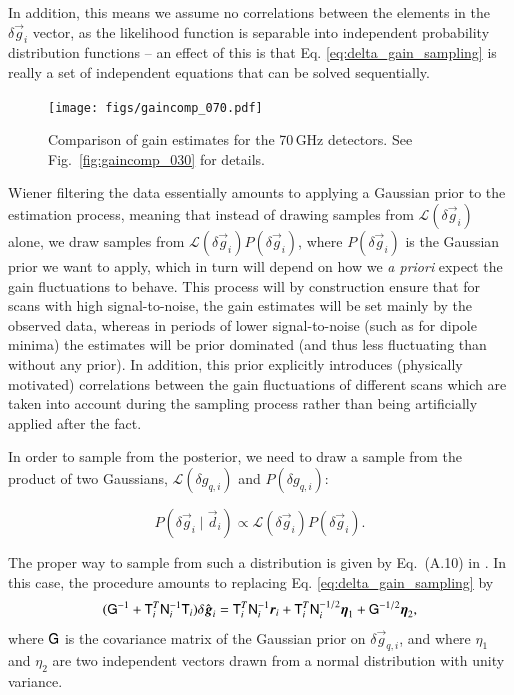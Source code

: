 \documentclass[twocolumn]{aa}
\renewcommand{\d}[0]{\vec{d}}
\newcommand{\T}[0]{\tens{T}}
\newcommand{\tG}[0]{\tens{G}}
\newcommand{\g}[0]{\vec{g}}
\newcommand{\N}[0]{\tens{N}}
\renewcommand{\r}[0]{\vec{r}}
\newcommand{\qi}[0]{_{q, i}}
\begin{document}
In addition, this means we assume no correlations between the elements in the $\delta \g_i$ vector, as the likelihood function is separable into independent probability distribution functions -- an effect of this is that Eq. \eqref{eq:delta_gain_sampling} is really a set of independent equations that can be solved sequentially. 
\begin{figure}[t]
  \center
  \texttt{[image: figs/gaincomp\_070.pdf]}
    \caption{Comparison of gain estimates for the 70\,GHz detectors. See Fig.~\ref{fig:gaincomp_030} for details.}
  \label{fig:gaincomp_070}
\end{figure}




Wiener filtering the data essentially amounts to applying a Gaussian prior to the estimation process, meaning that instead of drawing samples from $\mathcal{L}(\delta \g_i)$ alone, we draw samples from $\mathcal{L}(\delta \g_i) P(\delta \g_i)$, where $P(\delta \g_i)$ is the Gaussian prior we want to apply, which in turn will depend on how we \emph{a priori} expect the gain fluctuations to behave. This process will by construction ensure that for scans with high signal-to-noise, the gain estimates will be set mainly by the observed data, whereas in periods of lower signal-to-noise (such as for dipole minima) the estimates will be prior dominated (and thus less fluctuating than without any prior). In addition, this prior explicitly introduces (physically motivated) correlations between the gain fluctuations of different scans which are taken into account during the sampling process rather than being artificially applied after the fact.

In order to sample from the posterior, we need to draw a sample from the product of two Gaussians, $\mathcal{L}(\delta g\qi)$ and $P(\delta g\qi)$:

\begin{equation}
P(\delta \g_i \mid \d_i) \propto \mathcal{L}(\delta \g_i)P(\delta \g_i).
\end{equation}

The proper way to sample from such a distribution is given by Eq.~(A.10) in \citet{bp01}. In this case, the procedure amounts to replacing Eq. \eqref{eq:delta_gain_sampling} by 
\begin{equation}
    (\tG^{-1} + \T_i^T\N_i^{-1}\T_i)\delta \hat{\g}_i = \T_i^T\N_i^{-1}\r_i + \T_i^T\N_i^{-1/2}\vec\eta_1 + \tG^{-1/2}\vec\eta_2,
    \label{eq:delta_gain_sampling_with_prior}
\end{equation}
where $\tG$ is the covariance matrix of the Gaussian prior on $\delta\g\qi$, and where $\eta_1$ and $\eta_2$ are two independent vectors drawn from a normal distribution with unity variance. 
\end{document}
